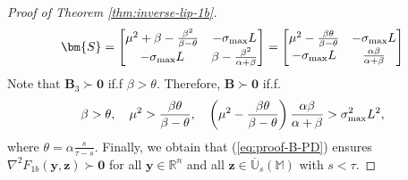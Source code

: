\documentclass{amsart} %
\def\eqref#1{equation~\ref{#1}}
\def\vzero{{\bm{0}}}
\def\vy{{\bm{y}}}
\def\vz{{\bm{z}}}
\def\mB{{\bm{B}}}
\def\mS{{\bm{S}}}
\def\sM{{\mathbb{M}}}
\def\sR{{\mathbb{R}}}
\def\sU{{\mathbb{U}}}
\theoremstyle{definition}
\theoremstyle{remark}
\renewcommand{\eqref}[1]{\textup{(\ref{#1})}}
\begin{document}
\begin{proof}[Proof of Theorem \ref{thm:inverse-lip-1b}]
\[ \mS =  \begin{bmatrix}
\mu^2 + \beta - \frac{\beta^2}{\beta-\theta} & - \sigma_{\textup{max}} L \\
- \sigma_{\textup{max}} L & \beta - \frac{\beta^2}{\alpha+\beta}
\end{bmatrix} = 
\begin{bmatrix}
\mu^2 - \frac{\beta \theta}{\beta-\theta} & - \sigma_{\textup{max}} L \\
- \sigma_{\textup{max}} L & \frac{\alpha\beta}{\alpha+\beta}
\end{bmatrix}
\]
Note that $\mB_3 \succ \vzero$ if.f $\beta > \theta$. Therefore, $\mB \succ \vzero$ if.f.
\begin{equation}
\label{eq:proof-B-PD}
\beta > \theta, \quad \mu^2 > \frac{\beta \theta}{\beta-\theta}, \quad \left(\mu^2 - \frac{\beta \theta}{\beta-\theta}\right)\frac{\alpha\beta}{\alpha+\beta} > \sigma^2_{\textup{max}} L^2,
\end{equation}
where $\theta = \alpha \frac{s}{\tau-s}$. Finally, we obtain that \eqref{eq:proof-B-PD} ensures $\nabla^2F_{1b}(\vy,\vz)\succ \vzero$ for all $\vy \in \sR^n$ and all $\vz \in \overline{\sU}_s(\sM)$ with $s < \tau$.


\end{proof}
\end{document}
